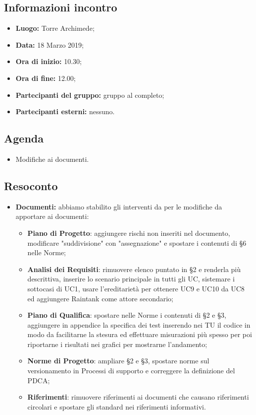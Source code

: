 \subsection{Informazioni incontro}
\begin{itemize}
	\item { \textbf{Luogo:} Torre Archimede};
	\item { \textbf{Data:} 18 Marzo 2019};
	\item { \textbf{Ora di inizio:} 10.30};
	\item { \textbf{Ora di fine:} 12.00};
	\item { \textbf{Partecipanti del gruppo:} gruppo al completo};
	\item { \textbf{Partecipanti esterni:} nessuno}.
\end{itemize}


\subsection{Agenda}
\begin{itemize}
	\item {Modifiche ai documenti.}
\end{itemize}

\subsection{Resoconto}
\begin{itemize}
	\item{ \textbf{Documenti:} abbiamo stabilito gli interventi da per le modifiche da apportare ai documenti:
		\begin{itemize}
			\item \textbf{Piano di Progetto}: aggiungere rischi non inseriti nel documento, modificare "suddivisione" con "assegnazione" e spostare i contenuti di §6 nelle Norme;
			\item \textbf{Analisi dei Requisiti}: rimuovere elenco puntato in §2 e renderla più descrittiva, inserire lo scenario principale in tutti gli UC, sistemare i sottocasi di UC1, usare l'ereditarietà per ottenere UC9 e UC10 da UC8 ed aggiungere Raintank come attore secondario;
			\item \textbf{Piano di Qualifica}: spostare nelle Norme i contenuti di §2 e §3, aggiungere in appendice la specifica dei test inserendo nei TU il codice in modo da facilitarne la stesura ed effettuare misurazioni più spesso per poi riportarne i risultati nei grafici per mostrarne l'andamento;
			\item \textbf{Norme di Progetto}: ampliare §2 e §3, spostare norme sul versionamento in Processi di supporto e correggere la definizione del PDCA;
			\item \textbf{Riferimenti}: rimuovere riferimenti ai documenti che causano riferimenti circolari e spostare gli standard nei riferimenti informativi.
		\end{itemize}}	

\end{itemize}


